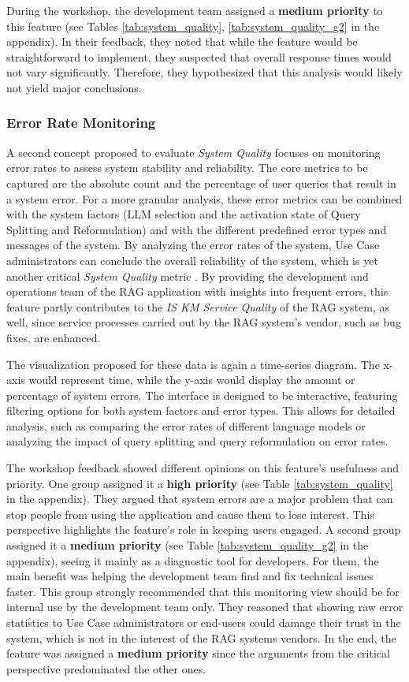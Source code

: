 \documentclass[
	english,
	ruledheaders=section,%
	class=report,%
	thesis={type=bachelor},%
	accentcolor=1b,%
	custommargins=true,%
	marginpar=false,%
	parskip=half-,%
	fontsize=11pt,%
	DIV=14,
]{tudapub}
\begin{document}
During the workshop, the development team assigned a \textbf{medium priority} to this feature (see Tables \ref{tab:system_quality}, \ref{tab:system_quality_g2} in the appendix). In their feedback, they noted that while the feature would be straightforward to implement, they suspected that overall response times would not vary significantly. Therefore, they hypothesized that this analysis would likely not yield major conclusions.
\subsubsection{Error Rate Monitoring}
A second concept proposed to evaluate \textit{System Quality} focuses on monitoring error rates to assess system stability and reliability. The core metrics to be captured are the absolute count and the percentage of user queries that result in a system error. For a more granular analysis, these error metrics can be combined with the system factors (LLM selection and the activation state of Query Splitting and Reformulation) and with the different predefined error types and messages of the system. By analyzing the error rates of the system, Use Case administrators can conclude the overall reliability of the system, which is yet another critical \textit{System Quality} metric \parencite[p.~64]{DeloneMcLean1992ISSuccess}. By providing the development and operations team of the RAG application with insights into frequent errors, this feature partly contributes to the \textit{IS KM Service Quality} \parencite[pp.~58--59]{Jennex2006} of the RAG system, as well, since service processes carried out by the RAG system's vendor, such as bug fixes, are enhanced.

The visualization proposed for these data is again a time-series diagram. The x-axis would represent time, while the y-axis would display the amount or percentage of system errors. The interface is designed to be interactive, featuring filtering options for both system factors and error types. This allows for detailed analysis, such as comparing the error rates of different language models or analyzing the impact of query splitting and query reformulation on error rates.

The workshop feedback showed different opinions on this feature's usefulness and priority. One group assigned it a \textbf{high priority} (see Table \ref{tab:system_quality} in the appendix). They argued that system errors are a major problem that can stop people from using the application and cause them to lose interest. This perspective highlights the feature's role in keeping users engaged. A second group assigned it a \textbf{medium priority} (see Table \ref{tab:system_quality_g2} in the appendix), seeing it mainly as a diagnostic tool for developers. For them, the main benefit was helping the development team find and fix technical issues faster. This group strongly recommended that this monitoring view should be for internal use by the development team only. They reasoned that showing raw error statistics to Use Case administrators or end-users could damage their trust in the system, which is not in the interest of the RAG systems vendors. In the end, the feature was assigned a \textbf{medium priority} since the arguments from the critical perspective predominated the other ones.
\end{document}
